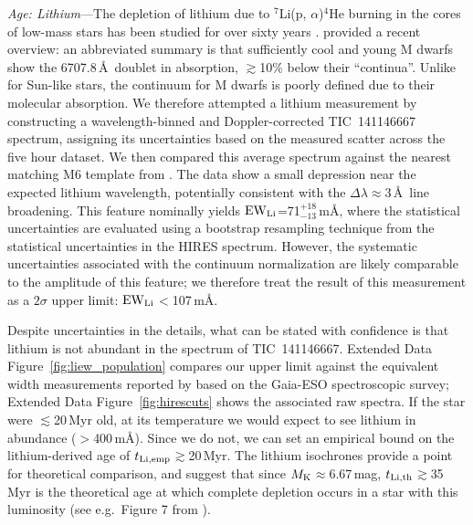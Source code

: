 \documentclass{nature3}
\begin{document}
\begin{methods}
{\it Age: Lithium}---The depletion of lithium due to $^7$Li(p,
$\alpha$)$^4$He burning in the cores of low-mass stars has been studied
for over sixty years \cite{Hayashi1963,Bildsten1997,Burke2004}.
\cite{Wood2023} provided a recent overview: an abbreviated
summary is that sufficiently cool and young M dwarfs show the 6707.8\,\AA\
doublet in absorption, $\gtrsim$10\% below their ``continua''.  Unlike
for Sun-like stars, the continuum for M dwarfs is poorly defined due to
their molecular absorption.  We therefore attempted a lithium measurement by
constructing a wavelength-binned and Doppler-corrected TIC~141146667
spectrum, assigning its uncertainties based on the measured scatter
across the five hour dataset.  We then compared this average spectrum
against the nearest matching M6 template from \cite{Bochanski2007}.  The
data show a small depression near the expected lithium wavelength,
potentially consistent with the $\Delta \lambda$$\approx$3\,\AA\ line
broadening.  This feature nominally yields ${\rm EW}_{\rm
Li}$=71$^{+18}_{-13}$\,m\AA, where the statistical uncertainties are
evaluated using a bootstrap resampling technique from the statistical
uncertainties in the HIRES spectrum.  However, the systematic uncertainties associated
with the continuum normalization are likely comparable to
the amplitude of this feature; we therefore treat the result of this
measurement as a $2\sigma$ upper limit: ${\rm EW}_{\rm Li}$$<$107\,m\AA.

Despite uncertainties in the details, what can be stated with confidence
is that lithium is not abundant in the spectrum of TIC~141146667.
Extended Data Figure~\ref{fig:liew_population} compares our upper limit against the
equivalent width measurements reported by \cite{Jeffries2023}
based on the Gaia-ESO spectroscopic survey; Extended Data Figure~\ref{fig:hirescuts}
shows the associated raw spectra.  If the star were $\lesssim$20\,Myr
old, at its temperature we would expect to see lithium in abundance
($>$400\,m\AA).  Since we do not, we can set an empirical bound on the
lithium-derived age of $t_{\rm Li,emp}$$\gtrsim$20\,Myr.  The
\cite{Feiden2016} lithium isochrones provide a point for theoretical
comparison, and suggest that since $M_{\rm K}$$\approx$6.67\,mag,
$t_{\rm Li,th}$$\gtrsim$35\,Myr is the theoretical age at which
complete depletion occurs in a star with this luminosity (see
e.g.~Figure 7 from \cite{Wood2023}).




\end{methods}
\end{document}
